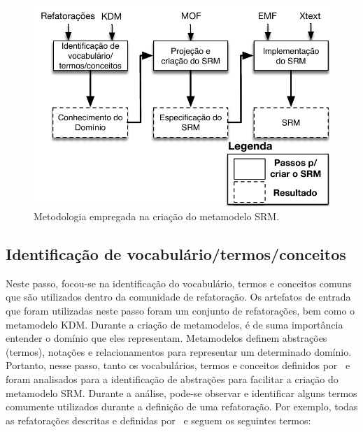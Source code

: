
\begin{figure}[h]
	\centering
	\caption{Metodologia empregada na criação do metamodelo SRM.}
	\label{fig:etapas_da_fase_de_e_do_SRM}
	\includegraphics[scale=0.65]{images/metodologiaParaCriarOSRM2}
	\fautor
\end{figure}



\subsection{Identificação de vocabulário/termos/conceitos}

Neste passo, focou-se na identificação do vocabulário, termos e conceitos comuns que são utilizados dentro da comunidade de refatoração. Os artefatos de entrada que foram utilizadas neste passo foram um conjunto de refatorações, bem como o metamodelo KDM. Durante a criação de metamodelos, é de suma importância entender o domínio que eles representam. Metamodelos definem abstrações (termos), notações e relacionamentos para representar um determinado domínio. Portanto, nesse passo, tanto os vocabulários, termos e conceitos definidos por~ e  foram analisados para a identificação de abstrações para facilitar a criação do metamodelo SRM. Durante a análise, pode-se observar e identificar alguns termos comumente utilizados durante a definição de uma refatoração. Por exemplo, todas as refatorações descritas e definidas por~ e  seguem os seguintes termos: 

